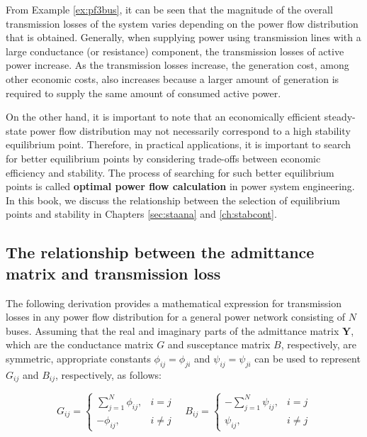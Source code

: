 \documentclass[graybox, envcountchap]{svmult}
\begin{document}
From Example \ref{ex:pf3bus}, it can be seen that the magnitude of the overall
transmission losses of the system varies depending on the power flow
distribution that is obtained. Generally, when supplying power using
transmission lines with a large conductance (or resistance) component, the
transmission losses of active power increase. As the transmission losses
increase, the generation cost, among other economic costs, also increases
because a larger amount of generation is required to supply the same amount of
consumed active power.

On the other hand, it is important to note that an economically efficient
steady-state power flow distribution may not necessarily correspond to a high
stability equilibrium point. Therefore, in practical applications, it is
important to search for better equilibrium points by considering trade-offs
between economic efficiency and stability. The process of searching for such
better equilibrium points is called \textbf{optimal power flow calculation} in
power system engineering. In this book, we discuss the relationship between the
selection of equilibrium points and stability in Chapters \ref{sec:staana} and
\ref{ch:stabcont}.

\subsection{The relationship between the admittance matrix and transmission
loss}

The following derivation provides a mathematical expression for transmission
losses in any power flow distribution for a general power network consisting of
$N$ buses. Assuming that the real and imaginary parts of the admittance matrix
$\bm{Y}$, which are the conductance matrix $G$ and susceptance matrix $B$,
respectively, are symmetric, appropriate constants $\phi_{ij}=\phi_{ji}$ and
$\psi_{ij}=\psi_{ji}$ can be used to represent $G_{ij}$ and $B_{ij}$,
respectively, as follows:

\begin{equation}\label{eq:GBrep}
  G_{ij} =
  \left\{
    \begin{array}{cl}
      \textstyle \sum_{j=1}^{N} \phi_{ij}, & i=j \\
      -\phi_{ij}, & i\neq j 
    \end{array}
  \right.
  \quad
  B_{ij}  =
  \left\{
    \begin{array}{cl}
      \textstyle - \sum_{j=1}^{N} \psi_{ij}, & i=j \\
      \psi_{ij}, & i\neq j 
    \end{array}
  \right.
\end{equation}
\end{document}
